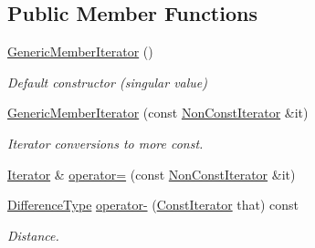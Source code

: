 \subsection*{Public Member Functions}
\begin{DoxyCompactItemize}
\item 
\mbox{\hyperlink{classrapidjson_1_1_generic_member_iterator_ac920af483c9e31a6746c22acf0dffc50}{Generic\+Member\+Iterator}} ()
\begin{DoxyCompactList}\small\item\em Default constructor (singular value) \end{DoxyCompactList}\item 
\mbox{\hyperlink{classrapidjson_1_1_generic_member_iterator_aa30ffef74b3f4978b403024d81b484e4}{Generic\+Member\+Iterator}} (const \mbox{\hyperlink{classrapidjson_1_1_generic_member_iterator_a1a91868fa388664bb301061e3e24badb}{Non\+Const\+Iterator}} \&it)
\begin{DoxyCompactList}\small\item\em Iterator conversions to more const. \end{DoxyCompactList}\item 
\mbox{\hyperlink{classrapidjson_1_1_generic_member_iterator_a37091c3dd8470486ef5188f3c1108653}{Iterator}} \& \mbox{\hyperlink{classrapidjson_1_1_generic_member_iterator_a192f924969f2b9d99ed1ec4ec2552884}{operator=}} (const \mbox{\hyperlink{classrapidjson_1_1_generic_member_iterator_a1a91868fa388664bb301061e3e24badb}{Non\+Const\+Iterator}} \&it)
\item 
\mbox{\hyperlink{classrapidjson_1_1_generic_member_iterator_aff2739a9265639a7a4be8c3e6216b31a}{Difference\+Type}} \mbox{\hyperlink{classrapidjson_1_1_generic_member_iterator_abfad2c34a97f82178cbf9464e958e2c2}{operator-\/}} (\mbox{\hyperlink{classrapidjson_1_1_generic_member_iterator_a61b9a9ba8a5917d90406532f104605cc}{Const\+Iterator}} that) const
\begin{DoxyCompactList}\small\item\em Distance. \end{DoxyCompactList}\end{DoxyCompactItemize}
